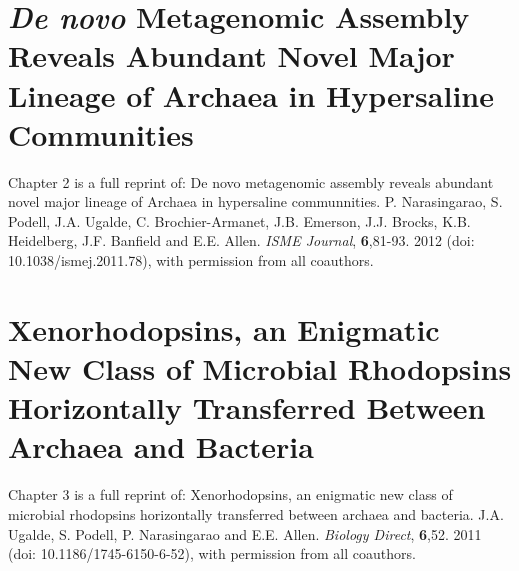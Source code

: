 \documentclass[12pt,chapterheads]{ucsd}
\begin{document}
%







%   
%   
%



\chapter{\textit{De novo} Metagenomic Assembly Reveals Abundant Novel Major Lineage of Archaea in Hypersaline Communities}

Chapter 2 is a full reprint of: De novo metagenomic assembly reveals abundant novel major lineage of Archaea in hypersaline communnities. P. Narasingarao, S. Podell, J.A. Ugalde, C. Brochier-Armanet, J.B. Emerson, J.J. Brocks, K.B. Heidelberg, J.F. Banfield and E.E. Allen. \textit{ISME Journal}, \textbf{6},81-93. 2012 (doi: 10.1038/ismej.2011.78), with permission from all coauthors.


\chapter{Xenorhodopsins, an Enigmatic New Class of Microbial Rhodopsins Horizontally Transferred Between Archaea and Bacteria}

Chapter 3 is a full reprint of: Xenorhodopsins, an enigmatic new class of microbial rhodopsins horizontally transferred between archaea and bacteria. J.A. Ugalde, S. Podell, P. Narasingarao and E.E. Allen. \textit{Biology Direct}, \textbf{6},52. 2011 (doi: 10.1186/1745-6150-6-52), with permission from all coauthors.


\end{document}
